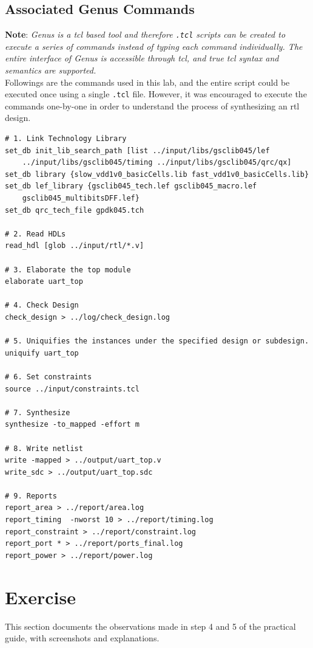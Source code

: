 \documentclass[a4paper,11pt]{article}%
\begin{document}
\pagebreak
\subsection{Associated Genus Commands}

\textbf{Note}: \textit{Genus is a \ac{tcl} based tool and therefore {\tt .tcl} scripts can be created to execute a series of commands instead of typing each command individually. The entire interface of Genus is accessible through \ac{tcl}, and true \ac{tcl} syntax and semantics are supported.}\\

Followings are the commands used in this lab, and the entire script could be executed once using a single {\tt .tcl} file. However, it was encouraged to execute the commands one-by-one in order to understand the process of synthesizing an \ac{rtl} design.

\begin{Verbatim}[frame=single]
# 1. Link Technology Library
set_db init_lib_search_path [list ../input/libs/gsclib045/lef
    ../input/libs/gsclib045/timing ../input/libs/gsclib045/qrc/qx]
set_db library {slow_vdd1v0_basicCells.lib fast_vdd1v0_basicCells.lib}
set_db lef_library {gsclib045_tech.lef gsclib045_macro.lef
    gsclib045_multibitsDFF.lef}
set_db qrc_tech_file gpdk045.tch

# 2. Read HDLs
read_hdl [glob ../input/rtl/*.v]

# 3. Elaborate the top module
elaborate uart_top

# 4. Check Design
check_design > ../log/check_design.log

# 5. Uniquifies the instances under the specified design or subdesign.
uniquify uart_top

# 6. Set constraints
source ../input/constraints.tcl

# 7. Synthesize 
synthesize -to_mapped -effort m

# 8. Write netlist
write -mapped > ../output/uart_top.v
write_sdc > ../output/uart_top.sdc

# 9. Reports
report_area > ../report/area.log
report_timing  -nworst 10 > ../report/timing.log
report_constraint > ../report/constraint.log
report_port * > ../report/ports_final.log
report_power > ../report/power.log
\end{Verbatim}

\pagebreak
\section{Exercise}
This section documents the observations made in step 4 and 5 of the practical guide, with screenshots and explanations.\\
\end{document}
